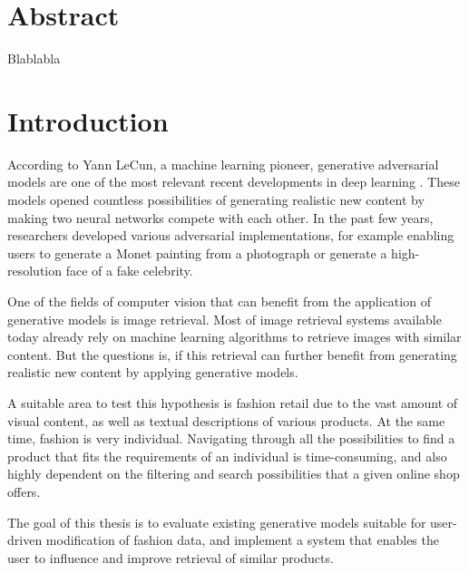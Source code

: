 \documentclass[12pt]{report}
\begin{document}


\chapter*{Abstract}
Blablabla
\clearpage

\pagestyle{plain}
\renewcommand{\baselinestretch}{0.75}\normalsize
\tableofcontents
\renewcommand{\baselinestretch}{1.0}\normalsize
\clearpage


\pagestyle{fancy}
\fancyhf{}
\lhead{\slshape\nouppercase{\rightmark}}
\rhead{ \thepage}
\renewcommand{\headrulewidth}{.5pt}
\chapter{Introduction}
According to Yann LeCun, a machine learning pioneer, generative adversarial models are one of the most relevant recent developments in deep learning \cite{yann_lecun_what_2016}. These models opened countless possibilities of generating realistic new content by making two neural networks compete with each other. In the past few years, researchers developed various adversarial implementations, for example enabling users to generate a Monet painting from a photograph or generate a high-resolution face of a fake celebrity.

One of the fields of computer vision that can benefit from the application of generative models is image retrieval. Most of image retrieval systems available today already rely on machine learning algorithms to retrieve images with similar content.  But the questions is, if this retrieval can further benefit from generating realistic new content by applying generative models.

A suitable area to test this hypothesis is fashion retail due to the vast amount of visual content, as well as textual descriptions of various products. At the same time, fashion is very individual. Navigating through all the possibilities to find a  product that fits the requirements of an individual is time-consuming, and also highly dependent on the filtering and search possibilities that a given online shop offers. 

The goal of this thesis is to evaluate existing generative models suitable for user-driven modification of fashion data, and implement a system that enables the user to influence and improve retrieval of similar products.
\end{document}

